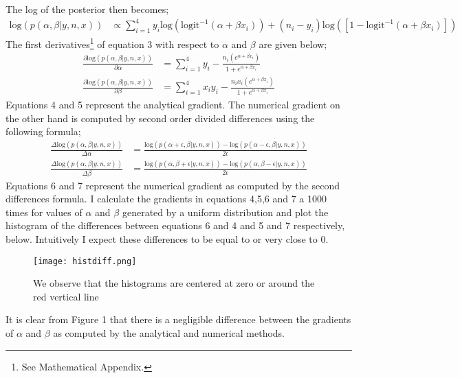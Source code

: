 \documentclass{article}
\begin{document}
The log of the posterior then becomes;
\begin{align}
\text{log} (p(\alpha, \beta | y, n, x)) &\propto \sum_{i = 1}^{4}y_i \text{log}(\text{logit}^{-1}(\alpha + \beta x_i)) + (n_i - y_i) \text{log}([1 - \text{logit}^{-1}(\alpha + \beta x_i) ])
\end{align}
The first derivatives\footnote{See Mathematical Appendix.} of equation 3 with respect to $\alpha$ and $\beta$ are given below;
\begin{align}
\frac{\partial \text{log}(p(\alpha, \beta | y, n, x))}{\partial \alpha} &= \sum_{i = 1}^{4} y_i - \frac{n_i (e^{\alpha + \beta x_i})}{1 + e ^{\alpha + \beta x_i}}\\
%
\frac{\partial \text{log}(p(\alpha, \beta | y, n, x))}{\partial \beta} &= \sum_{i = 1}^{4} x_iy_i - \frac{n_i x_i ( e^{\alpha + \beta x_i})}{1 + e ^{\alpha + \beta x_i}}
\end{align}
Equations 4 and 5 represent the analytical gradient. The numerical gradient on the other hand is computed by second order divided differences using the following formula;
\begin{align}
\frac{\Delta\text{log}(p(\alpha, \beta | y, n, x))}{\Delta \alpha} &= \frac{\text{log}(p(\alpha + \epsilon, \beta | y, n, x)) - \text{log}(p(\alpha - \epsilon, \beta | y, n, x))}{2\epsilon}\\
\frac{\Delta\text{log}(p(\alpha, \beta | y, n, x))}{\Delta \beta} &= \frac{\text{log}(p(\alpha , \beta+ \epsilon | y, n, x)) - \text{log}(p(\alpha , \beta - \epsilon| y, n, x))}{2\epsilon}
\end{align}
Equations 6 and 7 represent the numerical gradient as computed by the second differences formula. I calculate the gradients in equations 4,5,6 and 7 a 1000 times for values of $\alpha$ and $\beta$ generated by a uniform distribution and plot the histogram of the differences between equations 6 and 4 and 5 and 7 respectively, below. Intuitively I expect these differences to be equal to or very close to 0. 
 \begin{figure}[H]
\centering
\texttt{[image: histdiff.png]}
\caption{We observe that the histograms are centered at zero or around the red vertical line}
\label{deltat}
\end{figure}
It is clear from Figure 1 that there is a negligible difference between the gradients of $\alpha$ and $\beta$ as computed by the analytical and numerical methods.
\end{document}
